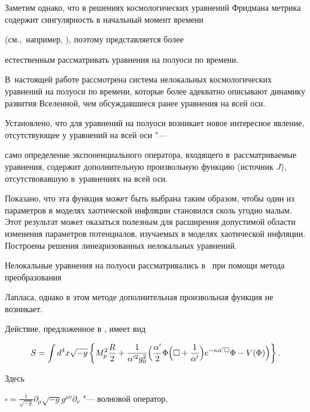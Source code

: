  Заметим однако, что в решениях космологических уравнений Фридмана метрика  содержит сингулярность в начальный момент времени

(см.,~например, \cite{Hawking}), поэтому представляется более

естественным рассматривать уравнения на полуоси по времени.

В~настоящей работе  рассмотрена система нелокальных космологических уравнений  на полуоси по времени, которые более адекватно описывают динамику развития  Вселенной, чем обсуждавшиеся ранее уравнения на всей оси.

 Установлено, что для уравнений на полуоси возникает новое интересное явление,  отсутствующее   у уравнений на всей оси "---

 само определение экспоненциального оператора, входящего в~рассматриваемые уравнения, содержит дополнительную  произвольную функцию (источник $J$),  отсутствовавшую в~уравнениях на всей оси.

 Показано, что эта  функция может быть выбрана таким образом,  чтобы один из параметров в моделях хаотической инфляции становился сколь угодно малым.  Этот результат может оказаться полезным для расширения допустимой области  изменения параметров потенциалов, изучаемых в моделях хаотической инфляции.  Построены решения линеаризованных нелокальных уравнений.



 Нелокальные уравнения на полуоси рассматривались в~\cite {BK:2008} при помощи  метода преобразования

 Лапласа, однако в этом методе дополнительная произвольная функция не возникает.



Действие, предложенное в \cite{IA04}, имеет вид 

\begin{equation*}

%

S=\int

d^4x\sqrt{-g}\left\{M_p^2\frac{R}{2}+\frac{1}{\alpha ^{\prime 2}g^2_0}\Bigl(\frac{\alpha ^{\prime}}{2}

\Phi \Bigl(\Box +\frac{1}{\alpha ^{\prime}}\Bigr)e^{-\kappa \alpha ^\prime\Box}\Phi-

V(\Phi)\Bigr)\right\}.

\end{equation*}

Здесь

$\square=\frac1{\sqrt{-g}}\partial _{\mu}\sqrt{-g}g^{\mu\nu}\partial _{\nu}$ "--- волновой оператор, 


